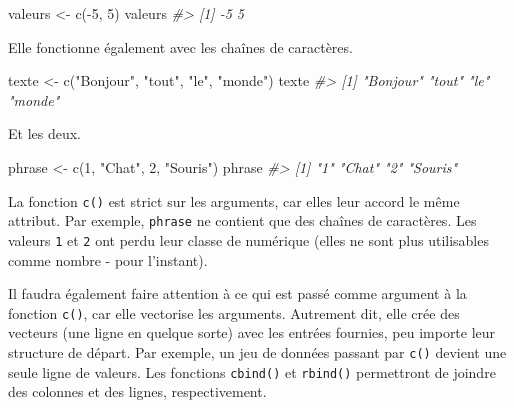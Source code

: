 \documentclass[
]{book}
\newenvironment{Shaded}{}{}
\newcommand{\CommentTok}[1]{\textit{#1}}
\newcommand{\DecValTok}[1]{#1}
\newcommand{\FunctionTok}[1]{#1}
\newcommand{\NormalTok}[1]{#1}
\newcommand{\OtherTok}[1]{#1}
\newcommand{\SpecialCharTok}[1]{#1}
\newcommand{\StringTok}[1]{#1}
\begin{document}
\begin{Shaded}
\begin{Highlighting}[]
\NormalTok{valeurs }\OtherTok{\textless{}{-}} \FunctionTok{c}\NormalTok{(}\SpecialCharTok{{-}}\DecValTok{5}\NormalTok{, }\DecValTok{5}\NormalTok{)}
\NormalTok{valeurs}
\CommentTok{\#\textgreater{} [1] {-}5  5}
\end{Highlighting}
\end{Shaded}

Elle fonctionne également avec les chaînes de caractères.

\begin{Shaded}
\begin{Highlighting}[]
\NormalTok{texte }\OtherTok{\textless{}{-}} \FunctionTok{c}\NormalTok{(}\StringTok{"Bonjour"}\NormalTok{, }\StringTok{"tout"}\NormalTok{, }\StringTok{"le"}\NormalTok{, }\StringTok{"monde"}\NormalTok{)}
\NormalTok{texte}
\CommentTok{\#\textgreater{} [1] "Bonjour" "tout"    "le"      "monde"}
\end{Highlighting}
\end{Shaded}

Et les deux.

\begin{Shaded}
\begin{Highlighting}[]
\NormalTok{phrase }\OtherTok{\textless{}{-}} \FunctionTok{c}\NormalTok{(}\DecValTok{1}\NormalTok{, }\StringTok{"Chat"}\NormalTok{, }\DecValTok{2}\NormalTok{, }\StringTok{"Souris"}\NormalTok{)}
\NormalTok{phrase}
\CommentTok{\#\textgreater{} [1] "1"      "Chat"   "2"      "Souris"}
\end{Highlighting}
\end{Shaded}

La fonction \texttt{c()} est strict sur les arguments, car elles leur accord le même attribut. Par exemple, \texttt{phrase} ne contient que des chaînes de caractères. Les valeurs \texttt{1} et \texttt{2} ont perdu leur classe de numérique (elles ne sont plus utilisables comme nombre - pour l'instant).

Il faudra également faire attention à ce qui est passé comme argument à la fonction \texttt{c()}, car elle vectorise les arguments. Autrement dit, elle crée des vecteurs (une ligne en quelque sorte) avec les entrées fournies, peu importe leur structure de départ. Par exemple, un jeu de données passant par \texttt{c()} devient une seule ligne de valeurs. Les fonctions \texttt{cbind()} et \texttt{rbind()} permettront de joindre des colonnes et des lignes, respectivement.
\end{document}
